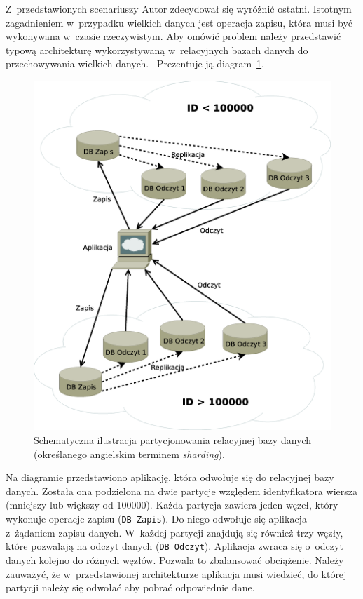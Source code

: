 Z~przedstawionych scenariuszy Autor zdecydował się wyróżnić ostatni. Istotnym zagadnieniem w~przypadku wielkich danych jest operacja zapisu, która musi być wykonywana w~czasie rzeczywistym. Aby omówić problem należy przedstawić typową architekturę wykorzystywaną w~relacyjnych bazach danych do przechowywania wielkich danych.~\cite{sharding_in_mysql} Prezentuje ją diagram~\ref{fig:sharding}.

\begin{figure}[ht!]
	\centering
	\includegraphics[width=.8\textwidth]{figures/sharding.eps}
	\caption{Schematyczna ilustracja partycjonowania relacyjnej bazy danych (określanego angielskim terminem \emph{sharding}).}
	\label{fig:sharding}
\end{figure}

Na diagramie przedstawiono aplikację, która odwołuje się do relacyjnej bazy danych. Została ona podzielona na dwie partycje względem identyfikatora wiersza (mniejszy lub większy od 100000). Każda partycja zawiera jeden węzeł, który wykonuje operacje zapisu (\verb+DB Zapis+). Do niego odwołuje się aplikacja z~żądaniem zapisu danych. W~każdej partycji znajdują się również trzy węzły, które pozwalają na odczyt danych (\verb+DB Odczyt+). Aplikacja zwraca się o~odczyt danych kolejno do różnych węzłów. Pozwala to zbalansować obciążenie. Należy zauważyć, że w~przedstawionej architekturze aplikacja musi wiedzieć, do której partycji należy się odwołać aby pobrać odpowiednie dane.

